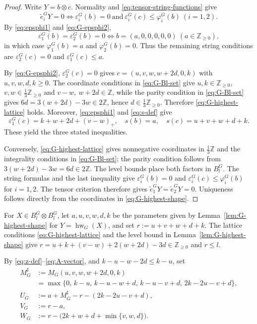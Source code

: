 \documentclass[11pt,reqno]{amsart}
\newcommand{\Zge}{\mathbb Z_{\ge 0}}
\newcommand{\hw}{\operatorname{hw}}
\numberwithin{table}{section}
\numberwithin{equation}{section}
\theoremstyle{plain}
\theoremstyle{definition}
\begin{document}
\begin{proof}
	Write \(Y=b\otimes c\).
	Normality and \eqref{eq:tensor-string-functions} give
	\[
	\widetilde e_i^G Y=0
	\iff
	\varepsilon_i^G(b)=0
	\ \text{and}\
	\varepsilon_i^G(c)\le\varphi_i^G(b)
	\ (i=1,2).
	\]
	By \eqref{eq:epsphi1} and \eqref{eq:G-epsphi2},
	\[
	\varepsilon_1^G(b)=\varepsilon_2^G(b)=0
	\iff
	b=(a,0,0,0,0,0)
	\ (a\in\Zge),
	\]
	in which case
	\(\varphi_1^G(b)=a\) and \(\varphi_2^G(b)=0\).
	Thus the remaining string conditions are
	\(\varepsilon_2^G(c)=0\) and \(\varepsilon_1^G(c)\le a\).
	
	By \eqref{eq:G-epsphi2}, \(\varepsilon_2^G(c)=0\) gives
	\(c=(u,v,w,w+2d,0,k)\) with \(u,v,w,d,k\ge0\).
	The coordinate conditions in \eqref{eq:G-Bl-set} give $u,k\in\Zge$, $v,w\in\tfrac13\Zge$ and $v-w,\ w+2d\in\mathbb Z$,
	while the parity condition in \eqref{eq:G-Bl-set} gives
	\(6d=3(w+2d)-3w\in2\mathbb Z\), hence
	\(d\in\tfrac13\Zge\).
	Therefore \eqref{eq:G-highest-lattice} holds.
	Moreover, \eqref{eq:epsphi1} and \eqref{eq:s-def} give
	\[
	\varepsilon_1^G(c)=k+w+2d+(v-w)_+,
	\quad
	s(b)=a,
	\quad
	s(c)=u+v+w+d+k.
	\]
	These yield the three stated inequalities.
	
	Conversely, \eqref{eq:G-highest-lattice} gives nonnegative
	coordinates in \(\tfrac13\mathbb Z\) and the integrality
	conditions in \eqref{eq:G-Bl-set}; the parity condition follows from
	\(3(w+2d)-3w=6d\in2\mathbb Z\).
	The level bounds place both factors in \(B_l^G\).
	The string formulas and the last inequality give $\varepsilon_i^G(b)=0$ and $\varepsilon_i^G(c)\le\varphi_i^G(b)$ for $i=1, 2$.
	The tensor criterion therefore gives
	\(\widetilde e_1^G Y=\widetilde e_2^G Y=0\).
	Uniqueness follows directly from the coordinates in
	\eqref{eq:G-highest-shape}.
\end{proof}


For \(X\in B_l^G\otimes B_l^G\), let \(a,u,v,w,d,k\) be the
parameters given by Lemma~\ref{lem:G-highest-shape} for
\(Y=\hw_G(X)\), and set \(r:=u+v+w+d+k\).
The lattice conditions \eqref{eq:G-highest-lattice} and the
level bound in Lemma~\ref{lem:G-highest-shape} give
\(r=u+k+(v-w)+2(w+2d)-3d\in\Zge\) and \(r\le l\).


By \eqref{eq:z-def}--\eqref{eq:A-vector}, and
\(k-u-w-2d\le k-u\), set
\begin{equation}\label{eq:G-UVW}
	\begin{aligned}
		M_G^\sharp
		&:=
		M_G(u,v,w,w+2d,0,k)\\
		&=
		\max\{
		0,\,
		k-u,\,
		k-u-w+d,\,
		k-u-v+d,\,
		2k-2u-v+d
		\},
		\\
		U_G
		&:=
		a+M_G^\sharp-r-(2k-2u-v+d),
		\\
		V_G
		&:=
		r-a,
		\\
		W_G
		&:=
		r-\bigl(2k+w+d+\min\{v,w,d\}\bigr).
	\end{aligned}
\end{equation}
\end{document}
